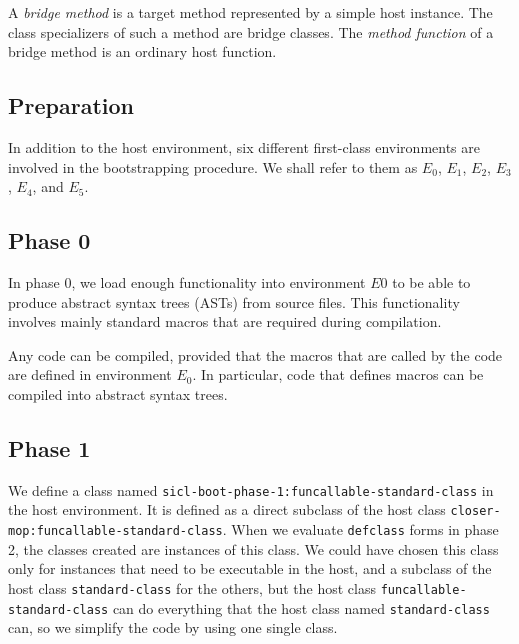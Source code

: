 \begin{definition}
A \emph{bridge method} is a target method represented by a simple host
instance.  The class specializers of such a method are bridge classes.
The \emph{method function} of a bridge method is an ordinary host
function.
\end{definition}

\subsection{Preparation}

In addition to the host environment, six different \sysname{}
first-class environments are involved in the bootstrapping procedure.
We shall refer to them as $E_0$, $E_1$, $E_2$, $E_3$, $E_4$, and $E_5$.

\subsection{Phase 0}

In phase $0$, we load enough functionality into environment $E0$ to be
able to produce abstract syntax trees (ASTs) from source files.  This
functionality involves mainly standard macros that are required during
compilation.

Any code can be compiled, provided that the macros that are called by
the code are defined in environment $E_0$.  In particular, code that
defines macros can be compiled into abstract syntax trees.

\subsection{Phase 1}

We define a class named
\texttt{sicl-boot-phase-1:funcallable-standard-class} in the host
environment.  It is defined as a direct subclass of the host class
\texttt{closer-mop:funcallable-standard-class}.  When we
evaluate \texttt{defclass} forms in phase 2, the classes created are
instances of this class.  We could have chosen this class only for
instances that need to be executable in the host, and a subclass of
the host class \texttt{standard-class} for the others, but the host
class \texttt{funcallable-standard-class} can do everything that the
host class named \texttt{standard-class} can, so we simplify the code by
using one single class.


